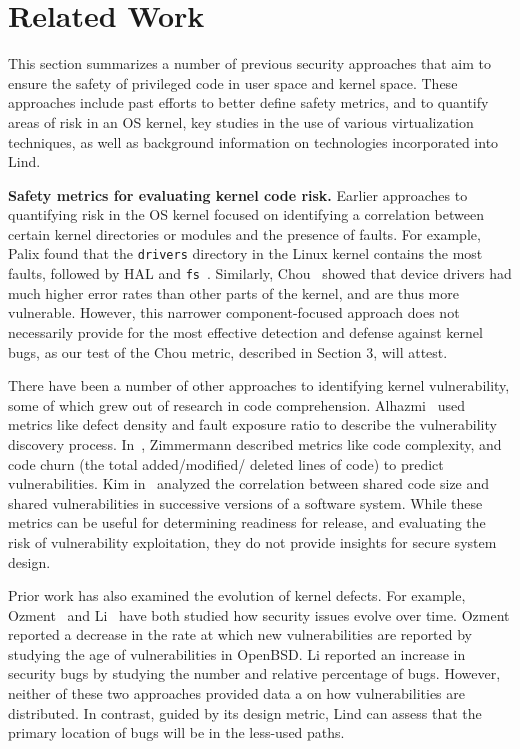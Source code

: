 \section{Related Work}
\label{sec.related_work}

This section summarizes a number of previous security approaches
that aim to ensure the safety of privileged code in user space and kernel space.
These approaches include past efforts to better define safety metrics, and to quantify
areas of risk in an OS kernel, key studies in the use of various virtualization
 techniques, as well as background information on technologies incorporated into
 Lind.

\textbf{Safety metrics for evaluating kernel code risk.}
Earlier approaches to quantifying risk
in the OS kernel focused on identifying a correlation between certain
kernel directories or modules and the presence of faults. For example,
Palix found that the \texttt{drivers} directory in the Linux kernel contains the
most faults, followed by HAL and \texttt{fs}~\cite{palix2011faults}. Similarly,
Chou~\cite{PittSFIeld} showed that device drivers had
much higher error rates than other parts of the kernel, and are thus more vulnerable.
However, this narrower component-focused approach does not necessarily
provide for the most effective detection and defense against kernel bugs, as our
test of the Chou metric, described in Section 3, will attest.

There have been a number of other approaches to identifying kernel vulnerability, some of
which grew out of research in code comprehension.  Alhazmi~\cite{alhazmi2008application}
used metrics like defect density and fault exposure ratio to describe the
vulnerability discovery process. In~\cite{zimmermann2010searching}, Zimmermann
described metrics like code complexity, and code churn (the total added/modified/
deleted lines of code) to predict vulnerabilities. Kim in~\cite{kim2007vulnerability} analyzed
the correlation between shared code size and shared vulnerabilities in
successive versions of a software system. While
these metrics can be useful for determining readiness for release, and
evaluating the risk of vulnerability exploitation,
they do not provide insights for secure system design.

Prior work has also examined the evolution of kernel defects. For example,
Ozment~\cite{ozment2006milk} and Li~\cite{li2006have} have
both studied how security issues evolve over
time. Ozment reported a decrease in the rate at which new vulnerabilities
are reported by studying the age of vulnerabilities in OpenBSD.  Li
reported an increase in security bugs by studying the number and relative
percentage of bugs. 
However, neither of these two approaches provided data
a on how vulnerabilities are distributed.
In contrast, guided by its design metric, Lind can assess that the primary location
of bugs will be in the less-used paths.

